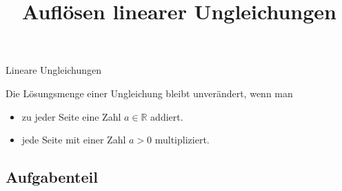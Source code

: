 \documentclass{uebungsblatt}
\title{Auflösen linearer Ungleichungen}
\begin{document}
\maketitle
\begin{contents}
    Lineare Ungleichungen
\end{contents}


\begin{theorem}
    Die Lösungsmenge einer Ungleichung bleibt unverändert, wenn man
    \begin{itemize}
        \item zu jeder Seite eine Zahl $a\in\mathbb{R}$ addiert.
        \item jede Seite mit einer Zahl $a>0$ multipliziert.
    \end{itemize}
\end{theorem}

\subsection*{Aufgabenteil}

\end{document}

